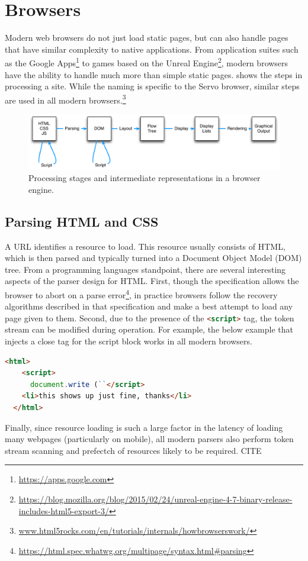 
\section{Browsers}
\label{sec:browsers}

Modern web browsers do not just load static pages, but can also handle pages that have similar
complexity to native applications.
From application suites such as the Google Apps\footnote{\url{https://apps.google.com}} to games
based on the Unreal Engine\footnote{\url{https://blog.mozilla.org/blog/2015/02/24/unreal-engine-4-7-binary-release-includes-html5-export-3/}},
modern browsers have the ability to handle much more than simple static pages.
 shows the steps in processing a site.
While the naming is specific to the Servo browser, similar steps are used in all modern browsers.\footnote{\url{www.html5rocks.com/en/tutorials/internals/howbrowserswork/}}
\begin{figure}%
  \begin{center}
    \includegraphics[scale=0.7]{pics/browser}
  \end{center}%
  \caption{Processing stages and intermediate representations in a browser engine.}
  \label{fig:browser}
\end{figure}%

\subsection{Parsing HTML and CSS}

A URL identifies a resource to load.
This resource usually consists of HTML, which is then parsed and typically turned into a Document Object
Model (DOM) tree.
From a programming languages standpoint, there are several interesting aspects of the parser design
for HTML.
First, though the specification allows the browser to abort on a parse error\footnote{\url{https://html.spec.whatwg.org/multipage/syntax.html#parsing}},
in practice browsers follow the recovery algorithms described in that specification and make a best attempt to
load any page given to them.
Second, due to the presence of the \lstinline[language=HTML]{<script>} tag, the token stream can be modified
during operation.
For example, the below example that injects a close tag for the script block works in all modern browsers.
\begin{lstlisting}[language=HTML]
  <html>
    <script>
      document.write (``</script>
    <li>this shows up just fine, thanks</li>
  </html>
\end{lstlisting}
Finally, since resource loading is such a large factor in the latency of loading many webpages (particularly on mobile),
all modern parsers also perform token stream scanning and prefectch of resources likely to be required. CITE

